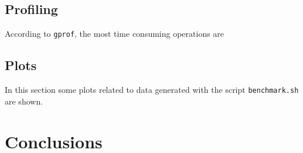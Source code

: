 \documentclass[]{article}
\def\code#1{\texttt{#1}}
\begin{document}
\subsection{Profiling}
\label{sec:profile}
According to \code{gprof}, the most time consuming operations are 

\subsection{Plots}
\label{sec:plots}
In this section some plots related to data generated with the script \code{benchmark.sh} are shown.

\section{Conclusions}
\label{sec:conclusion}
\end{document}
